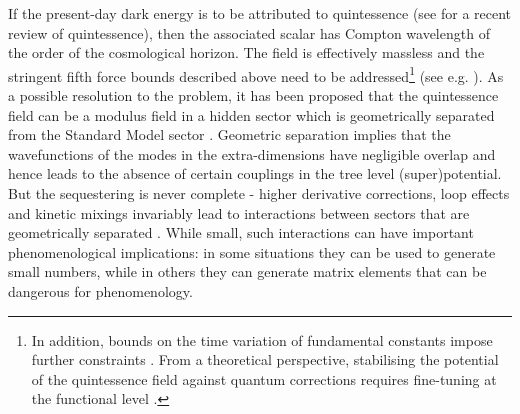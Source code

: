 \documentclass[11pt,a4paper]{article}
\begin{document}
If the present-day dark energy is to be attributed to quintessence (see \cite{Tsujikawa:2013fta} for a recent review of quintessence), then the associated scalar has Compton wavelength of the order of the cosmological horizon. The field is effectively massless and the stringent fifth force bounds described above need to be addressed\footnote{In addition, bounds on the time variation of fundamental constants impose further constraints \cite{Martins:2017yxk}. From a  theoretical perspective, stabilising the potential of the quintessence field against quantum corrections requires fine-tuning at the functional level \cite{Banks:2001qc, Garny:2006wc, Marsh:2018kub}.} (see e.g.  \cite{Carroll:1998zi}). As a possible resolution to the problem, it has been proposed that the quintessence field can be a modulus field  in a hidden sector which is geometrically separated from the Standard Model sector \cite{Agrawal:2018own, Obied:2018sgi}. Geometric separation implies that the wavefunctions of the modes in the extra-dimensions have negligible overlap and hence leads to the absence of certain couplings in the tree level (super)potential. But the sequestering is never complete - higher derivative corrections, loop effects and kinetic mixings invariably lead to interactions between sectors that are geometrically separated \cite{mixkac}. While small, such interactions can have important phenomenological implications: in some situations  they can be used to generate small numbers, while in others they can generate matrix elements that can be dangerous for phenomenology.
\end{document}
